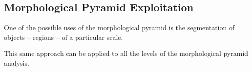 




\subsection{Morphological Pyramid Exploitation}
One of the possible uses of the morphological pyramid is the
segmentation of objects -- regions -- of a particular scale.



This same approach can be applied to all the levels of the
morphological pyramid analysis.

